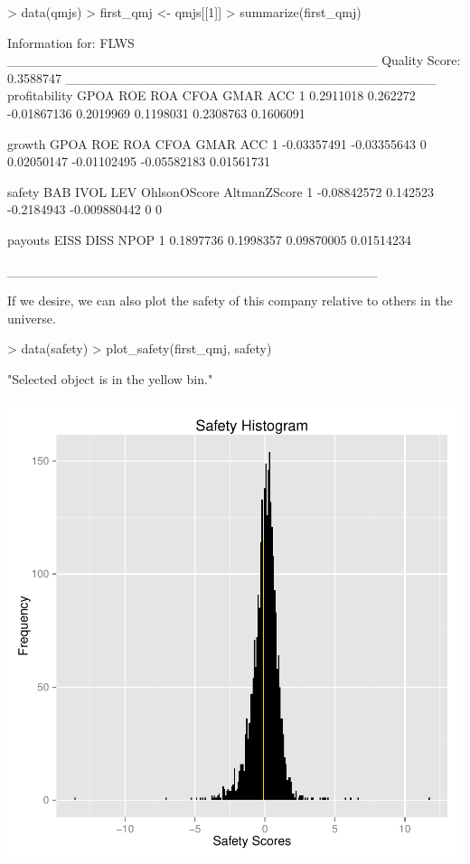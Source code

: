 \documentclass[titlepage]{article}
\begin{document}
\begin{Schunk}
\begin{Sinput}
> data(qmjs)
> first_qmj <- qmjs[[1]]
> summarize(first_qmj) 
\end{Sinput}
\begin{Soutput}
Information for:  FLWS
_______________________________________
Quality Score:  0.3588747
_______________________________________
  profitability     GPOA         ROE       ROA      CFOA      GMAR       ACC
1     0.2911018 0.262272 -0.01867136 0.2019969 0.1198031 0.2308763 0.1606091


       growth        GPOA ROE        ROA        CFOA        GMAR        ACC
1 -0.03357491 -0.03355643   0 0.02050147 -0.01102495 -0.05582183 0.01561731


       safety      BAB       IVOL          LEV OhlsonOScore AltmanZScore
1 -0.08842572 0.142523 -0.2184943 -0.009880442            0            0


    payouts      EISS       DISS       NPOP
1 0.1897736 0.1998357 0.09870005 0.01514234

_______________________________________
\end{Soutput}
\end{Schunk}

If we desire, we can also plot the safety of this company relative to others in the universe.

\begin{Schunk}
\begin{Sinput}
> data(safety)
> plot_safety(first_qmj, safety)
\end{Sinput}
\begin{Soutput}
[1] "Selected object is in the yellow bin."
\end{Soutput}
\end{Schunk}
\includegraphics{paper-003}
\end{document}
